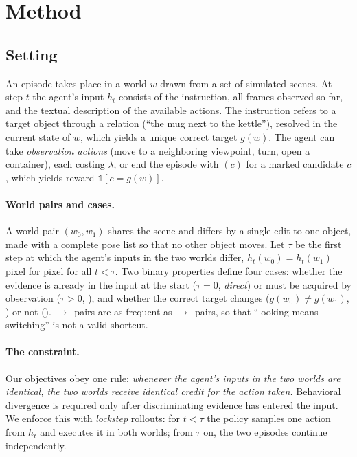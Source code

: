 \section{Method}
\label{sec:method}

\subsection{Setting}
An episode takes place in a world $w$ drawn from a set of simulated scenes.
At step $t$ the agent's input $h_t$ consists of the instruction, all frames observed so far, and the textual description of the available actions.
The instruction refers to a target object through a relation (\eg ``the mug next to the kettle''), resolved in the current state of $w$, which yields a unique correct target $g(w)$.
The agent can take \emph{observation actions} (move to a neighboring viewpoint, turn, open a container), each costing $\lambda$, or end the episode with \commit$(c)$ for a marked candidate $c$, which yields reward $\mathbb{1}[c = g(w)]$.

\paragraph{World pairs and cases.}
A world pair $(w_0, w_1)$ shares the scene and differs by a single edit to one object, made with a complete pose list so that no other object moves.
Let $\tau$ be the first step at which the agent's inputs in the two worlds differ, \ie $h_t(w_0) = h_t(w_1)$ pixel for pixel for all $t < \tau$.
Two binary properties define four cases:
whether the evidence is already in the input at the start ($\tau = 0$, \emph{direct}) or must be acquired by observation ($\tau > 0$, \Look), and whether the correct target changes ($g(w_0) \neq g(w_1)$, \Flip) or not (\Stay).
\Look$\to$\Stay\ pairs are as frequent as \Look$\to$\Flip\ pairs, so that ``looking means switching'' is not a valid shortcut.

\paragraph{The constraint.}
Our objectives obey one rule: \emph{whenever the agent's inputs in the two worlds are identical, the two worlds receive identical credit for the action taken.}
Behavioral divergence is required only after discriminating evidence has entered the input.
We enforce this with \emph{lockstep} rollouts: for $t < \tau$ the policy samples one action from $h_t$ and executes it in both worlds; from $\tau$ on, the two episodes continue independently.


